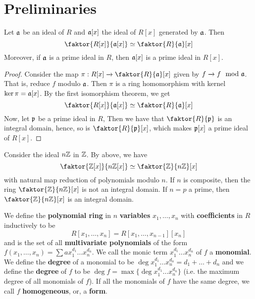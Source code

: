 \section{Preliminaries}

\begin{theorem}\label{1.1.1}
    Let $\mathfrak{a}$ be an ideal of  $R$ and $\mathfrak{a}[x]$ the ideal of $R[x]$ generated by
    $\mathfrak{a}$. Then
    \begin{equation*}
        \faktor{R[x]}{\af[x]} \simeq \faktor{R}{\af}[x]
    \end{equation*}
    Moreover, if $\mathfrak{a}$ is a prime ideal in $R$, then $\mathfrak{a}[x]$ is a prime ideal in
    $R[x]$.
\end{theorem}
\begin{proof}
    Consider the map $\pi:R[x] \xrightarrow{} \faktor{R}{\af}[x]$ given by $f
    \xrightarrow{} f \mod{\mathfrak{a}}$. That is, reduce $f$ modulo  $\mathfrak{a}$.  Then $\pi$ is a
    ring homomorphism with kernel $\ker{\pi}=\mathfrak{a}[x]$. By the first isomorphism
    theorem, we get
    \begin{equation*}
        \faktor{R[x]}{\af[x]} \simeq \faktor{R}{\af}[x]
    \end{equation*}
    Now, let $\mathfrak{p}$ be a prime ideal in $R$, Then we have that $\faktor{R}{\pf}$ is
    an integral domain, hence, so is $\faktor{R}{\pf}[x]$, which makes $\mathfrak{p}[x]$ a
    prime ideal of $R[x]$.
\end{proof}

\begin{example}\label{example_1.1}
    Consider the ideal $n\mathbb{Z}$ in  $\mathbb{Z}$. By above, we have
    \begin{equation*}
        \faktor{\Z[x]}{n\Z[x]} \simeq \faktor{\Z}{n\Z}[x]
    \end{equation*}
    with natural map reduction of polynomials modulo $n$. If $n$ is composite,
    then the ring $\faktor{\Z}{n\Z}[x]$ is not an integral domain. If $n=p$ a
    prime, then  $\faktor{\Z}{n\Z}[x]$ is an integral domain.
\end{example}

\begin{definition}
    We define the \textbf{polynomial ring} in $n$  \textbf{variables} $x_1,
    \dots, x_n$ with \textbf{coefficients} in $R$ inductively to be
    \begin{equation*}
        R[x_1, \dots, x_n]=R[x_1, \dots, x_{n-1}][x_n]
    \end{equation*}
    and is the set of all \textbf{multivariate polynomials} of the form $f(x_1,
    \dots,x_n)=\sum{ax_1^{d_1} \dots x_n^{d_n}}$. We call the monic term
    $x_1^{d_1} \dots x_n^{d_n}$ of $f$ a  \textbf{monomial}. We define the
    \textbf{degree} of a monomial to be $\deg{x_1^{d_1} \dots
    x_n^{d_n}}=d_1+\dots+d_n$ and we define the \textbf{degree} of $f$ to be
    $\deg{f}=\max{\{\deg{x_1^{d_1} \dots x_n^{d_n}}\}}$ (i.e. the maximum degree
    of all monomials of $f$). If all the monomials of $f$ have the same degree,
    we call  $f$  \textbf{homogeneous}, or, a \textbf{form}.
\end{definition}

